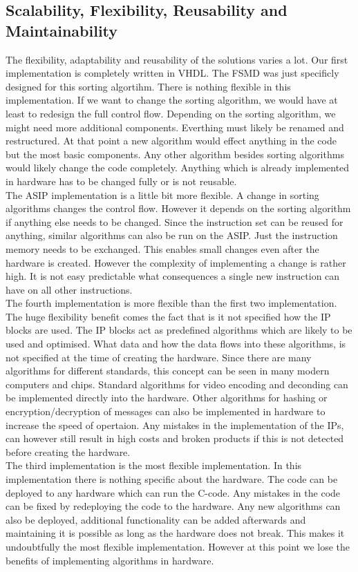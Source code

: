 \documentclass[conference]{IEEEtran}
\begin{document}
\subsection{Scalability, Flexibility, Reusability and Maintainability}
The flexibility, adaptability and reusability of the solutions varies a lot. Our first implementation is completely written in VHDL. The FSMD was just specificly designed for this sorting algortihm. There is nothing flexible in this implementation. If we want to change the sorting algorithm, we would have at least to redesign the full control flow. Depending on the sorting algorithm, we might need more additional components. Everthing must likely be renamed and restructured. At that point a new algorithm would effect anything in the code but the most basic components. Any other algorithm besides sorting algorithms would likely change the code completely. Anything which is already implemented in hardware has to be changed fully or is not reusable. \\
The ASIP implementation is a little bit more flexible. A change in sorting algorithms changes the control flow. However it depends on the sorting algorithm if anything else needs to be changed. Since the instruction set can be reused for anything, similar algorithms can also be run on the ASIP. Just the instruction memory needs to be exchanged. This enables small changes even after the hardware is created. However the complexity of implementing a change is rather high. It is not easy predictable what consequences a single new instruction can have on all other instructions. \\
The fourth implementation is more flexible than the first two implementation. The huge flexibility benefit comes the fact that is it not specified how the IP blocks are used. The IP blocks act as predefined algorithms which are likely to be used and optimised. What data and how the data flows into these algorithms, is not specified at the time of creating the hardware. Since there are many algorithms for different standards, this concept can be seen in many modern computers and chips. Standard algorithms for video encoding and deconding can be implemented directly into the hardware. Other algorithms for hashing or encryption/decryption of messages can also be implemented in hardware to increase the speed of opertaion. Any mistakes in the implementation of the IPs, can however still result in high costs and broken products if this is not detected before creating the hardware. \\
The third implementation is the most flexible implementation. In this implementation there is nothing specific about the hardware. The code can be deployed to any hardware which can run the C-code. Any mistakes in the code can be fixed by redeploying the code to the hardware. Any new algorithms can also be deployed, additional functionality can be added afterwards and maintaining it is possible as long as the hardware does not break. This makes it undoubtfully the most flexible implementation. However at this point we lose the benefits of implementing algorithms in hardware. \\
\end{document}
